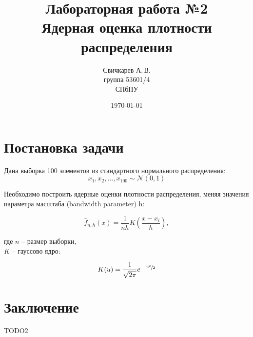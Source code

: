 \documentclass{article} %
\title{Лабораторная работа №2\\Ядерная оценка плотности распределения} %
\author{Свичкарев А.\,В.\\группа 53601/4\\СПбПУ} %
\date{\today} %
\begin{document}

\maketitle %

\section{Постановка задачи}
Дана выборка 100 элементов из стандартного нормального \mbox{распределения}:
\[x_1,x_2,\dotsc,x_{100}\sim\mathcal{N}(0,1)\]

Необходимо построить ядерные оценки плотности распределения, меняя значения параметра масштаба (bandwidth parameter) h:

\[\hat{f}_{n,h}(x) = \frac{1}{nh}K{\left(\frac{x-x_i}{h}\right)},\]

где $n$ -- размер выборки,\\
\indent $K$ -- гауссово ядро:

\[K(u) = \frac{1}{\sqrt{2\pi}}e^{\sfrac{-u^2}{2}}\]

\section{Заключение}
TODO2
\end{document}
